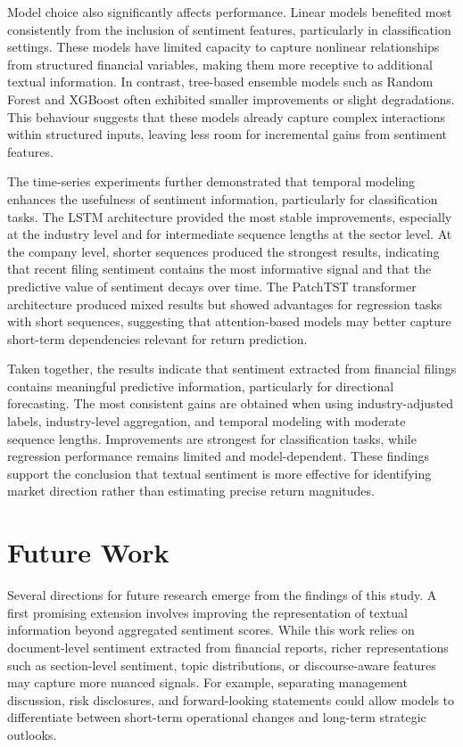 Model choice also significantly affects performance. Linear models benefited most consistently from the inclusion of sentiment features, particularly in classification settings. These models have limited capacity to capture nonlinear relationships from structured financial variables, making them more receptive to additional textual information. In contrast, tree-based ensemble models such as Random Forest and XGBoost often exhibited smaller improvements or slight degradations. This behaviour suggests that these models already capture complex interactions within structured inputs, leaving less room for incremental gains from sentiment features.

The time-series experiments further demonstrated that temporal modeling enhances the usefulness of sentiment information, particularly for classification tasks. The LSTM architecture provided the most stable improvements, especially at the industry level and for intermediate sequence lengths at the sector level. At the company level, shorter sequences produced the strongest results, indicating that recent filing sentiment contains the most informative signal and that the predictive value of sentiment decays over time. The PatchTST transformer architecture produced mixed results but showed advantages for regression tasks with short sequences, suggesting that attention-based models may better capture short-term dependencies relevant for return prediction.

Taken together, the results indicate that sentiment extracted from financial filings contains meaningful predictive information, particularly for directional forecasting. The most consistent gains are obtained when using industry-adjusted labels, industry-level aggregation, and temporal modeling with moderate sequence lengths. Improvements are strongest for classification tasks, while regression performance remains limited and model-dependent. These findings support the conclusion that textual sentiment is more effective for identifying market direction rather than estimating precise return magnitudes.

\section{Future Work}

Several directions for future research emerge from the findings of this study. A first promising extension involves improving the representation of textual information beyond aggregated sentiment scores. While this work relies on document-level sentiment extracted from financial reports, richer representations such as section-level sentiment, topic distributions, or discourse-aware features may capture more nuanced signals. For example, separating management discussion, risk disclosures, and forward-looking statements could allow models to differentiate between short-term operational changes and long-term strategic outlooks.

